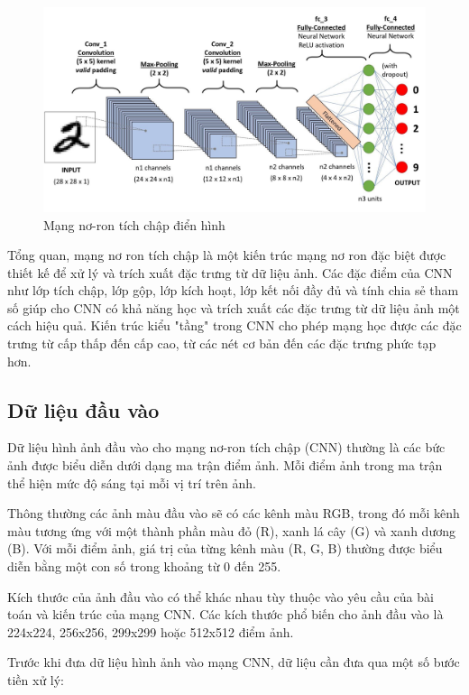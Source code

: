 \begin{figure}
	\centering
	\includegraphics[width=0.9\linewidth]{images/typical-cnn.png}
	\caption{Mạng nơ-ron tích chập điển hình\cite{Ratan_2023}}
	\label{fig:typical-cnn}
\end{figure}

Tổng quan, mạng nơ ron tích chập là một kiến trúc mạng nơ ron đặc biệt được thiết kế để xử lý và trích xuất đặc trưng từ dữ liệu ảnh. Các đặc điểm của CNN như lớp tích chập, lớp gộp, lớp kích hoạt, lớp kết nối đầy đủ và tính chia sẻ tham số giúp cho CNN có khả năng học và trích xuất các đặc trưng từ dữ liệu ảnh một cách hiệu quả. Kiến trúc kiểu "tầng" trong CNN cho phép mạng học được các đặc trưng từ cấp thấp đến cấp cao, từ các nét cơ bản đến các đặc trưng phức tạp hơn.

\subsection{Dữ liệu đầu vào}

Dữ liệu hình ảnh đầu vào cho mạng nơ-ron tích chập (CNN) thường là các bức ảnh được biểu diễn dưới dạng ma trận điểm ảnh. Mỗi điểm ảnh trong ma trận thể hiện mức độ sáng tại mỗi vị trí trên ảnh.

Thông thường các ảnh màu đầu vào sẽ có các kênh màu RGB, trong đó mỗi kênh màu tương ứng với một thành phần màu đỏ (R), xanh lá cây (G) và xanh dương (B). Với mỗi điểm ảnh, giá trị của từng kênh màu (R, G, B) thường được biểu diễn bằng một con số trong khoảng từ 0 đến 255.

Kích thước của ảnh đầu vào có thể khác nhau tùy thuộc vào yêu cầu của bài toán và kiến trúc của mạng CNN. Các kích thước phổ biến cho ảnh đầu vào là 224x224, 256x256, 299x299 hoặc 512x512 điểm ảnh.

Trước khi đưa dữ liệu hình ảnh vào mạng CNN, dữ liệu cần đưa qua một số bước tiền xử lý:

